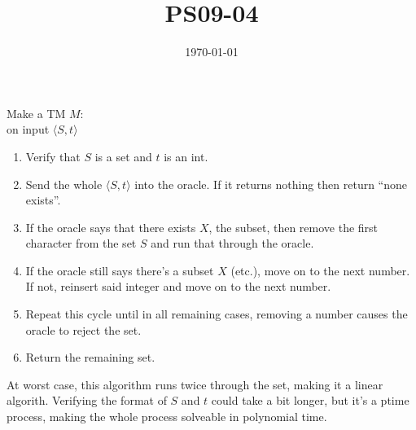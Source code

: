\documentclass{article}
\title{PS09-04}
\date{\today}
\begin{document}
\maketitle
Make a TM $M$:\\
on input $\langle S, t \rangle$
\begin{enumerate}
	\item Verify that $S$ is a set and $t$ is an int.
	\item Send the whole $\langle S, t \rangle$ into the oracle. If it returns nothing then return ``none exists''.
	\item If the oracle says that there exists $X$, the subset, then remove the first character from the set $S$ and run that through the oracle. 
	\item If the oracle still says there's a subset $X$ (etc.), move on to the next number. If not, reinsert said integer and move on to the next number.
	\item Repeat this cycle until in all remaining cases, removing a number causes the oracle to reject the set. 
	\item Return the remaining set.
\end{enumerate}
At worst case, this algorithm runs twice through the set, making it a linear algorith. Verifying the format of $S$ and $t$ could take a bit longer, but it's a ptime process, making the whole process solveable in polynomial time.
\end{document}
